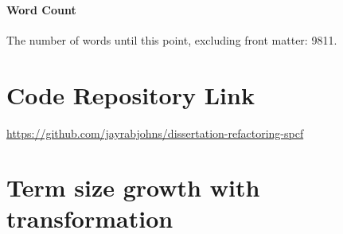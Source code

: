 \documentclass[12pt,a4paper]{report}
\theoremstyle{definition}
\theoremstyle{definition}
\theoremstyle{remark}
\begin{document}
\vfill
\subsubsection{Word Count}
The number of words until this point, excluding front matter: 9811.



\appendix

\chapter{Code Repository Link}
\url{https://github.com/jayrabjohns/dissertation-refactoring-spcf}





\chapter{Term size growth with transformation}\label{appendix:term-growth}
\end{document}
